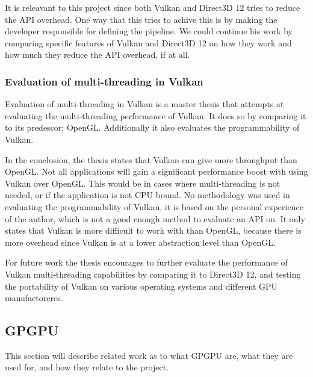 It is releavant to this project  since both Vulkan and Direct3D 12 tries to reduce the \gls{API} overhead.
One way that this tries to achive this is by making the developer responsible for defining the pipeline.
We could continue his work by comparing specific features of Vulkan and Direct3D 12 on how they work and how much they reduce the \gls{API} overhead, if at all.

\subsubsection{Evaluation of multi-threading in Vulkan}

Evaluation of multi-threading in Vulkan \cite{blackert_2016_evaluation} is a master thesis that attempts at evaluating the multi-threading performance of Vulkan. It does so by comparing it to its predescor; OpenGL. 
Additionally it also evaluates the programmability of Vulkan. 

In the conclusion, the thesis states that Vulkan can give more throughput than OpenGL. 
Not all applications will gain a significant performance boost with using Vulkan over OpenGL. 
This would be in cases where multi-threading is not needed, or if the application is not CPU bound. 
No methodology was used in evaluating the programmability of Vulkan, it is based on the personal experience of the author, which is not a good enough method to evaluate an \gls{API} on. 
It only states that Vulkan is more difficult to work with than OpenGL, because there is more overhead since Vulkan is at a lower abstraction level than OpenGL. 

For future work the thesis encourages to further evaluate the performance of Vulkan multi-threading  capabilities by comparing it to Direct3D 12, and testing the portability of Vulkan on various operating systems and different \gls{GPU} manufactoreres.

\subsection{\gls{GPGPU}}
This section will describe related work as to what GP\gls{GPU} are, what they are used for, and how they relate to the project.

